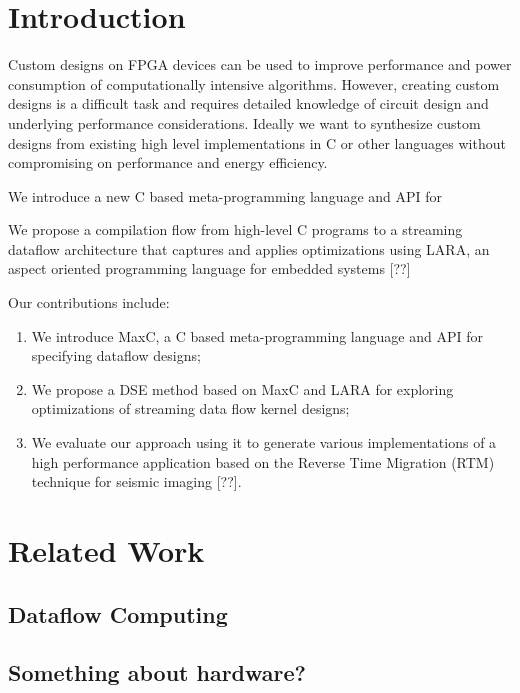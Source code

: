\documentclass[conference]{IEEEtran}
\begin{document}
\section{Introduction}

 Custom designs on FPGA devices can be used to improve performance and
power consumption of computationally intensive algorithms. However,
creating custom designs is a difficult task and requires detailed
knowledge of circuit design and underlying performance
considerations. Ideally we want to synthesize custom designs from
existing high level implementations in C or other languages without
compromising on performance and energy efficiency.

We introduce a new C based meta-programming language and API for


We propose a compilation flow from high-level C programs to a
streaming dataflow architecture that captures and applies
optimizations using LARA, an aspect oriented programming language for
embedded systems [??]

Our contributions include:
\begin{enumerate}

\item We introduce MaxC, a C based meta-programming language and API
  for specifying dataflow designs;

\item We propose a DSE method based on MaxC and LARA for exploring
  optimizations of streaming data flow kernel designs;

\item We evaluate our approach using it to generate various
  implementations of a high performance application based on the
  Reverse Time Migration (RTM) technique for seismic imaging [??].

\end{enumerate}

\section{Related Work}

\subsection{Dataflow Computing}

\subsection{Something about hardware?}
\end{document}
